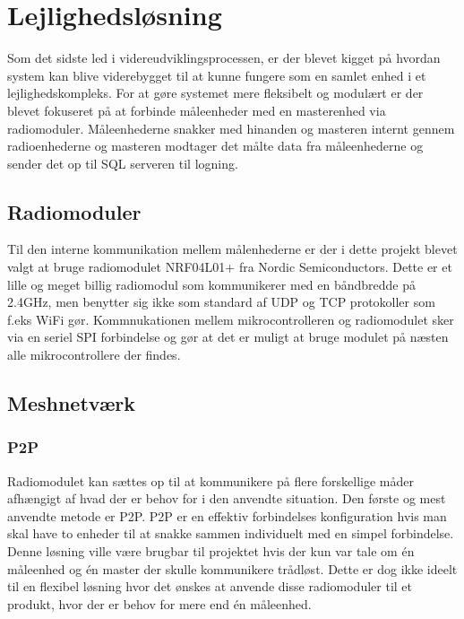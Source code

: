 \section{Lejlighedsløsning}
Som det sidste led i videreudviklingsprocessen, er der blevet kigget på hvordan system kan blive viderebygget til at kunne fungere som en samlet enhed i et lejlighedskompleks. For at gøre systemet mere fleksibelt og modulært er der blevet fokuseret på at forbinde måleenheder med en masterenhed via radiomoduler. Måleenhederne snakker med hinanden og masteren internt gennem radioenhederne og masteren modtager det målte data fra måleenhederne og sender det op til SQL serveren til logning.
\newpage
\subsection{Radiomoduler}
Til den interne kommunikation mellem målenhederne er der i dette projekt blevet valgt at bruge radiomodulet NRF04L01+ fra Nordic Semiconductors.
\newline
Dette er et lille og meget billig radiomodul som kommunikerer med en båndbredde på 2.4GHz, men benytter sig ikke som standard af UDP og TCP protokoller som f.eks WiFi gør. 
Kommnukationen mellem mikrocontrolleren og radiomodulet sker via en seriel SPI forbindelse og gør at det er muligt at bruge modulet på næsten alle mikrocontrollere der findes.

\subsection{Meshnetværk}
\subsubsection*{P2P}
Radiomodulet kan sættes op til at kommunikere på flere forskellige måder afhængigt af hvad der er behov for i den anvendte situation.
Den første og mest anvendte metode er P2P.
\newline
\newline
P2P er en effektiv forbindelses konfiguration hvis man skal have to enheder til at snakke sammen individuelt med en simpel forbindelse. Denne løsning ville være brugbar til projektet hvis der kun var tale om én måleenhed og én master der skulle kommunikere trådløst. Dette er dog ikke ideelt til en flexibel løsning hvor det ønskes at anvende disse radiomoduler til et produkt, hvor der er behov for mere end én måleenhed.
\newpage
